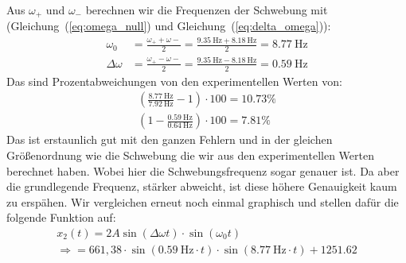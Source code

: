 \documentclass{article}
\begin{document}
                  Aus \(\omega_{+}\) und \(\omega_{-}\) berechnen wir die Frequenzen der Schwebung mit (Gleichung~(\ref{eq:omega_null}) und Gleichung~(\ref{eq:delta_omega})):
                  \begin{equation}
                      \begin{aligned}
                          \omega_0      & = \frac{ \omega_{+} + \omega{-} }{ 2 } = \frac{ \SI{9.35}{\hertz} + \SI{8.18}{\hertz} }{2} = \SI{8.77}{\hertz} \\ %
                          \Delta \omega & = \frac{ \omega_{+} - \omega{-} }{ 2 } = \frac{ \SI{9.35}{\hertz} - \SI{8.18}{\hertz} }{2} = \SI{0.59}{\hertz} %
                      \end{aligned}
                  \end{equation}
                  Das sind Prozentabweichungen von den experimentellen Werten von:
                  \begin{equation}
                      \begin{gathered}
                          \left( \frac{ \SI{8.77}{\hertz} }{ \SI{7.92}{\hertz} } - 1 \right) \cdot 100 = 10.73 \% \\ %
                          \left( 1 - \frac{ \SI{0.59}{\hertz} }{ \SI{0.64}{\hertz} } \right) \cdot 100 = 7.81 \% %
                      \end{gathered}
                  \end{equation}
                  Das ist erstaunlich gut mit den ganzen Fehlern und in der gleichen Größenordnung wie die Schwebung die wir aus den experimentellen Werten berechnet haben.
                  Wobei hier die Schwebungsfrequenz sogar genauer ist. Da aber die grundlegende Frequenz, stärker abweicht, ist diese höhere Genauigkeit kaum zu erspähen.
                  Wir vergleichen erneut noch einmal graphisch und stellen dafür die folgende Funktion auf:
                  \begin{equation}
                      \begin{gathered}
                          x_2(t) = 2 A \sin( \Delta \omega t ) \cdot \sin( \omega_0 t) \\
                          \Rightarrow = 661,38 \cdot \sin( \SI{0.59}{\hertz} \cdot t) \cdot \sin( \SI{8.77}{\hertz} \cdot t) + 1251.62
                      \end{gathered}
                  \end{equation}
\end{document}
